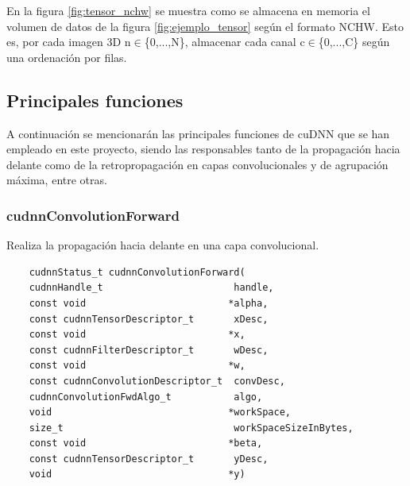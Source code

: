 En la figura \ref{fig:tensor_nchw} se muestra como se almacena en memoria el volumen de datos de la figura \ref{fig:ejemplo_tensor} según el formato NCHW. Esto es, por cada imagen 3D n$\in$\{0,...,N\}, almacenar cada canal c$\in$\{0,...,C\} según una ordenación por filas.

\subsection{Principales funciones}

A continuación se mencionarán las principales funciones de cuDNN que se han empleado en este proyecto, siendo las responsables tanto de la propagación hacia delante como de la retropropagación en capas convolucionales y de agrupación máxima, entre otras.

\subsubsection{cudnnConvolutionForward}
Realiza la propagación hacia delante en una capa convolucional.

\begin{verbatim}
	cudnnStatus_t cudnnConvolutionForward(
	cudnnHandle_t                       handle,
	const void                         *alpha,
	const cudnnTensorDescriptor_t       xDesc,
	const void                         *x,
	const cudnnFilterDescriptor_t       wDesc,
	const void                         *w,
	const cudnnConvolutionDescriptor_t  convDesc,
	cudnnConvolutionFwdAlgo_t           algo,
	void                               *workSpace,
	size_t                              workSpaceSizeInBytes,
	const void                         *beta,
	const cudnnTensorDescriptor_t       yDesc,
	void                               *y)
\end{verbatim}

